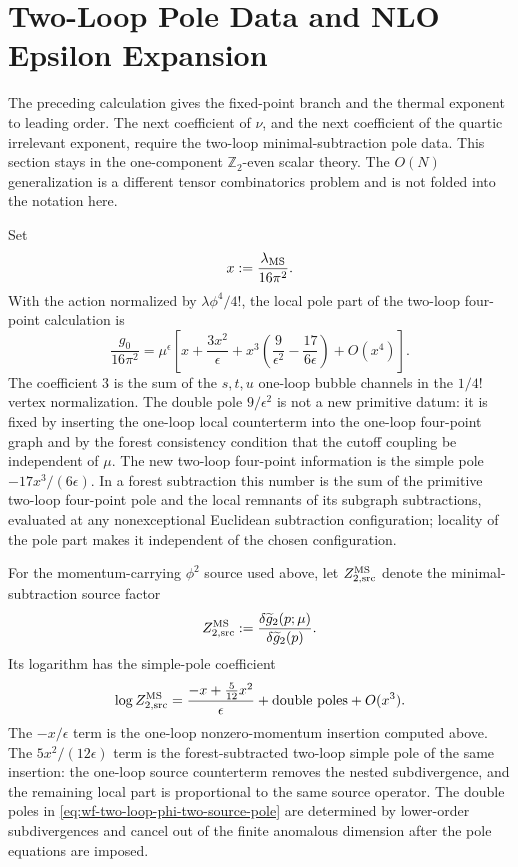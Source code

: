\section{Two-Loop Pole Data and NLO Epsilon Expansion}
\label{sec:wilson-fisher-two-loop-nlo}

The preceding calculation gives the fixed-point branch and the thermal
exponent to leading order.  The next coefficient of \(\nu\), and the next
coefficient of the quartic irrelevant exponent, require the two-loop
minimal-subtraction pole data.  This section stays in the one-component
\(\mathbb Z_2\)-even scalar theory.  The \(O(N)\) generalization is a
different tensor combinatorics problem and is not folded into the notation
here.

Set
\[
  x:=\frac{\lambda_{\rm MS}}{16\pi^2}.
\]
With the action normalized by \(\lambda\phi^4/4!\), the local pole part of the
two-loop four-point calculation is
\begin{equation}
  \frac{g_0}{16\pi^2}
  =
  \mu^\epsilon
  \left[
    x+\frac{3x^2}{\epsilon}
    +x^3\left(\frac{9}{\epsilon^2}
      -\frac{17}{6\epsilon}\right)
    +O(x^4)
  \right].
  \label{eq:wf-two-loop-coupling-pole-map}
\end{equation}
The coefficient \(3\) is the sum of the \(s,t,u\) one-loop bubble channels in
the \(1/4!\) vertex normalization.  The double pole \(9/\epsilon^2\) is not a
new primitive datum: it is fixed by inserting the one-loop local counterterm
into the one-loop four-point graph and by the forest consistency condition
that the cutoff coupling be independent of \(\mu\).  The new two-loop
four-point information is the simple pole
\(-17x^3/(6\epsilon)\).  In a forest subtraction this number is the sum of the
primitive two-loop four-point pole and the local remnants of its subgraph
subtractions, evaluated at any nonexceptional Euclidean subtraction
configuration; locality of the pole part makes it independent of the chosen
configuration.

For the momentum-carrying \(\phi^2\) source used above, let
\(Z_{2,\rm src}^{\rm MS}\) denote the minimal-subtraction source factor
\begin{equation}
  Z_{2,\rm src}^{\rm MS}
  :=
  \frac{\delta\widetilde g_2(p;\mu)}
       {\delta\widetilde g_2(p)} .
  \label{eq:wf-two-loop-phi-two-source-factor}
\end{equation}
Its logarithm has the simple-pole coefficient
\begin{equation}
  \log Z_{2,\rm src}^{\rm MS}
  =
  \frac{-x+\frac{5}{12}x^2}{\epsilon}
  +\hbox{double poles}
  +O(x^3).
  \label{eq:wf-two-loop-phi-two-source-pole}
\end{equation}
The \(-x/\epsilon\) term is the one-loop nonzero-momentum insertion computed
above.  The \(5x^2/(12\epsilon)\) term is the forest-subtracted two-loop
simple pole of the same insertion: the one-loop source counterterm removes
the nested subdivergence, and the remaining local part is proportional to the
same source operator.  The double poles in
\eqref{eq:wf-two-loop-phi-two-source-pole} are determined by lower-order
subdivergences and cancel out of the finite anomalous dimension after the
pole equations are imposed.

